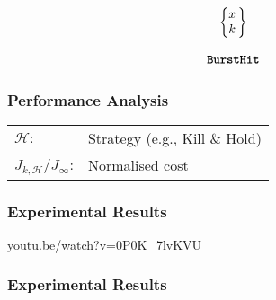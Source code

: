 \begin{frame}
    \vspace{1cm}

    \large
    \begin{equation*}
        \begin{matrix}
            \left\{\begin{matrix}
                x \\
                k
            \end{matrix}\,\right\} \\
                                 \\
            \texttt{\textbf{BurstHit}}
        \end{matrix}
    \end{equation*}
\end{frame}


\begin{frame}
    \frametitle{Performance Analysis}
    \begin{figure}[h]
        \centering
        
    \end{figure}

    \centering
    \begin{tabular}{l l}
        $\mathcal{H}:$ & Strategy (e.g., Kill \& Hold)\\
        $J_{k,\mathcal{H}}/J_\infty$: & Normalised cost \\
    \end{tabular}
\end{frame}




\begin{frame}
    \frametitle{Experimental Results}
    \centering
    \LARGE
    \textcolor{hicolour}{\url{youtu.be/watch?v=0P0K\_7lvKVU}}
\end{frame}


\begin{frame}
    \frametitle{Experimental Results}
    \begin{figure}[h]
        \centering
        \resizebox{0.85\textwidth}{!}{}
    \end{figure}
\end{frame}
